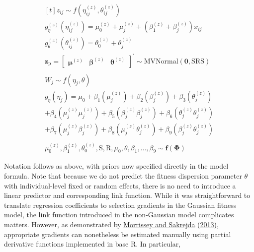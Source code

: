 \documentclass{article}
\begin{document}
\begin{equation} \tag{2}\label{eq:2}
\begin{gathered}[t]
z_{ij} \sim f \left(\eta^{(z)}_{ij }, \theta^{(z)}_{ij} \right)  \\
g_\eta^{(z)} \left( \eta^{(z)}_{ij} \right) = \mu_0^{(z)} + \mu_j^{(z)}+ \left(\beta_1^{(z)} + \beta_j^{(z)} \right) x_{ij} \nonumber \\
g_\theta^{(z)} \left( \theta^{(z)}_{ij} \right) = \theta_0^{(z)} + \theta_{j}^{(z)} \nonumber \\
\boldsymbol{z_{\mathrm{p}}} = \begin{bmatrix}
\boldsymbol{\mu}^{(z)} &
\boldsymbol{\beta}^{(z)} &
\boldsymbol{\theta}^{(z)} \end{bmatrix} ^{\prime}
 \sim \mathrm{M}\mathrm{VNormal} \left(
\boldsymbol{0},\boldsymbol{\mathrm{S}}\boldsymbol{\mathrm{R}}\boldsymbol{\mathrm{S}} \right) \nonumber \\ 
\nonumber \\
W_{j} \sim f \left(\eta_{j}, \theta \right)   \nonumber \\
g_\eta \left( \eta_{j} \right)  = \mu_0 + \beta_1 \left( \mu^{(z)}_{j} \right) + 
                \beta_2 \left( \beta_j^{(z)} \right) + 
                \beta_3 \left( \theta^{(z)}_{j} \right)  \nonumber  \\ 
                + \beta_4 \left( \mu^{(z)}_j \mu^{(z)}_j \right) +
                \beta_5\left( \beta^{(z)}_j \beta^{(z)}_j \right) +
                \beta_6 \left( \theta^{(z)}_j \theta^{(z)}_j \right)\\ 
                +  \beta_7 \left( \mu^{(z)}_j \beta^{(z)}_j \right) + 
                \beta_8 \left( \mu^{(z)}_j \theta^{(z)}_j \right) + 
                 \beta_9 \left( \beta^{(z)}_j \theta^{(z)}_j \right) \nonumber \\ \nonumber \\ 
\mu_0^{(z)},\beta_1^{(z)}, \theta_0^{(z)}, \boldsymbol{\mathrm{S}}, \boldsymbol{\mathrm{R}}, \mu_0, \theta, \beta_1, ... , \beta_9
\sim \boldsymbol{f}(\boldsymbol{\Phi}) \nonumber 
\end{gathered}
\end{equation}

Notation follows as above, with priors now specified directly in the
model formula. Note that because we do not predict the fitness
dispersion parameter \(\theta\) with individual-level fixed or random
effects, there is no need to introduce a linear predictor and
corresponding link function. While it was straightforward to translate
regression coefficients to selection gradients in the Gaussian fitness
model, the link function introduced in the non-Gaussian model
complicates matters. However, as demonstrated by
\protect\hyperlink{ref-Morrissey2013}{Morrissey and Sakrejda}
(\protect\hyperlink{ref-Morrissey2013}{2013}), appropriate gradients can
nonetheless be estimated manually using partial derivative functions
implemented in base R. In particular,
\end{document}
